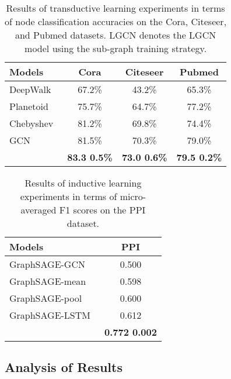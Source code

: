 \documentclass[sigconf]{acmart}
\begin{document}
\begin{table}[t]
\centering \caption{Results of transductive learning experiments in
terms of node classification accuracies on the Cora, Citeseer, and
Pubmed datasets. LGCN denotes the LGCN model using the
sub-graph training strategy.} \label{table:trans}
\begin{tabular}{  l   c  c  c  }
    \hline
    \textbf{Models} & \textbf{Cora} & \textbf{Citeseer} & \textbf{Pubmed} \\ \hline\hline
    DeepWalk~\cite{perozzi2014deepwalk}            & 67.2\% & 43.2\%  & 65.3\%   \\ \hline
    Planetoid~\cite{yang2016revisiting}            & 75.7\% & 64.7\%  & 77.2\%   \\ \hline
    Chebyshev~\cite{defferrard2016convolutional}   & 81.2\% & 69.8\%  & 74.4\%   \\ \hline
    GCN~\cite{kipf2016semi}                        & 81.5\% & 70.3\%  & 79.0\%   \\ \hline
\textbf{} & \textbf{83.3  0.5\%}
                                                   & \textbf{73.0  0.6\%}
                                                   & \textbf{79.5  0.2\%} \\
    \hline
\end{tabular}
\end{table}


\begin{table}[t]
\centering \caption{Results of inductive learning experiments in
terms of micro-averaged F1 scores on the PPI dataset.}
\label{table:induc}
\begin{tabular}{  l   c }
    \hline
    \textbf{Models} & \textbf{PPI} \\ \hline\hline
    GraphSAGE-GCN~\cite{hamilton2017inductive}     & 0.500 \\ \hline
    GraphSAGE-mean~\cite{hamilton2017inductive}    & 0.598 \\ \hline
    GraphSAGE-pool~\cite{hamilton2017inductive}    & 0.600 \\ \hline
    GraphSAGE-LSTM~\cite{hamilton2017inductive}    & 0.612 \\ \hline
    \textbf{} & \textbf{0.772  0.002} \\
    \hline
\end{tabular}
\end{table}



\subsection{Analysis of Results}
\end{document}
